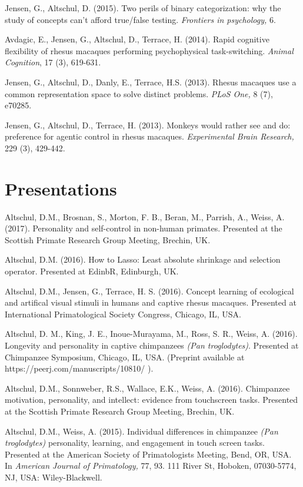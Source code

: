 \documentclass[margin,line]{res}
\begin{document}
\begin{resume}
Jensen, G., Altschul, D. (2015). Two perils of binary categorization: why the study of concepts can't afford true/false testing. {\it Frontiers in psychology,} 6.

Avdagic, E., Jensen, G., Altschul, D., Terrace, H. (2014). Rapid cognitive flexibility of rhesus macaques performing psychophysical task-switching. {\it Animal Cognition}, 17 (3), 619-631.

Jensen, G., Altschul, D., Danly, E., Terrace, H.S. (2013). Rhesus macaques use a common representation space to solve distinct problems. {\it PLoS One,} 8 (7), e70285.

Jensen, G., Altschul, D., Terrace, H. (2013). Monkeys would rather see and do: preference for agentic control in rhesus macaques. {\it Experimental Brain Research,} 229 (3), 429-442.

\vspace{0.7cm}

\section{\sc Presentations} 

Altschul, D.M., Brosnan, S., Morton, F. B., Beran, M., Parrish, A., Weiss, A. (2017). Personality and self-control in non-human primates. Presented at the Scottish Primate Research Group Meeting, Brechin, UK.

Altschul, D.M. (2016). How to Lasso: Least absolute shrinkage and selection operator. Presented at EdinbR, Edinburgh, UK.

Altschul, D.M., Jensen, G.,  Terrace, H. S. (2016). Concept learning of ecological and artifical visual stimuli in humans and captive rhesus macaques. Presented at International Primatological Society Congress, Chicago, IL, USA.

Altschul, D. M., King, J. E., Inoue-Murayama, M., Ross, S. R., Weiss, A. (2016). Longevity and personality in captive chimpanzees {\it (Pan troglodytes)}. Presented at Chimpanzee Symposium, Chicago, IL, USA. (Preprint available at https://peerj.com/manuscripts/10810/ ).

Altschul, D.M., Sonnweber, R.S., Wallace, E.K., Weiss, A. (2016). Chimpanzee motivation, personality, and intellect: evidence from touchscreen tasks. Presented at the Scottish Primate Research Group Meeting, Brechin, UK.

Altschul, D.M., Weiss, A. (2015). Individual differences in chimpanzee {\it (Pan troglodytes)} personality, learning, and engagement in touch screen tasks. Presented at the American Society of Primatologists Meeting, Bend, OR, USA. In {\it American Journal of Primatology,} 77, 93. 111 River St, Hoboken, 07030-5774, NJ, USA: Wiley-Blackwell.


\end{resume}
\end{document}
